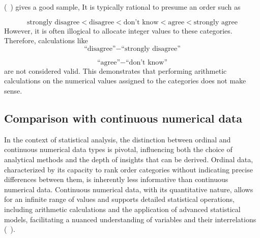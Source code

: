 \documentclass{article}
\begin{document}
(~\textcite{Johnson1999}) gives a good sample,
 It is typically rational to presume an order such as

 \[
 \text{strongly disagree} < \text{disagree} < \text{don’t know} < \text{agree} < \text{strongly agree}
\]
 However, it is often illogical to allocate integer values to these categories. Therefore, calculations like
\[
\text{``disagree''} - \text{``strongly disagree''}
\]

\[
\text{``agree''} - \text{``don't know''}
\]
are not considered valid. 
This demonstrates that performing arithmetic calculations on the numerical values assigned to the categories does not make sense.


\subsection{Comparison with continuous numerical data}

In the context of statistical analysis, the distinction between ordinal and continuous numerical data types is pivotal, influencing both the choice of analytical methods and the depth of insights that can be derived. 
Ordinal data, characterized by its capacity to rank order categories without indicating precise differences between them, is inherently less informative than continuous numerical data. 
Continuous numerical data, with its quantitative nature, allows for an infinite range of values and supports detailed statistical operations, including arithmetic calculations and the application of advanced statistical models, facilitating a nuanced understanding of variables and their interrelations (~\cite{Stevens1946}).
\end{document}
